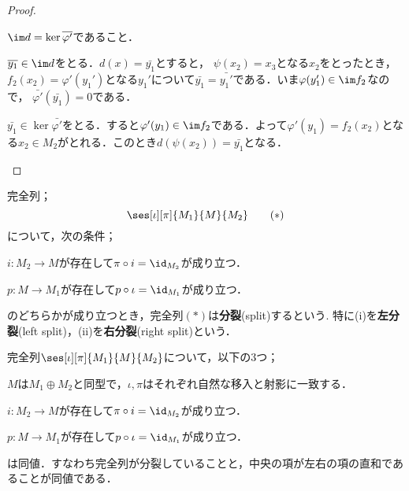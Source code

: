 \begin{proof}
\begin{step}
\begin{sakura}
			\item $\im d=\ker\bar{\varphi'}$であること．
			
			$\bar{y_1}\in\im d$をとる．$d(x)=\bar{y_1}$とすると， $\psi(x_2)=x_3$となる$x_2$をとったとき， $f_2(x_2)=\varphi'(y_1')$となる$y_1'$について$\bar{y_1}=\bar{y_1'}$である．いま$\varphi(y_1')\in\im f_2$なので， $\bar{\varphi'}(\bar{y_1})=0$である．
			
			$\bar{y_1}\in\ker\bar{\varphi'}$をとる．すると$\varphi'(y_1)\in\im f_2$である．よって$\varphi'(y_1)=f_2(x_2)$となる$x_2\in M_2$がとれる．このとき$d(\psi(x_2))=\bar{y_1}$となる．
		\end{sakura}
	\end{step}
\end{proof}

\begin{defi}[分裂完全列]
	完全列；
	\[\ses[\iota][\pi]{M_1}{M}{M_2}\tag{$\ast$}\]
	について，次の条件；
	\begin{sakura}
		\item $i:M_2\to M$が存在して$\pi\circ i=\id_{M_2}$が成り立つ．
		\item $p:M\to M_1$が存在して$p\circ\iota=\id_{M_1}$が成り立つ．
	\end{sakura}
	のどちらかが成り立つとき，完全列$(\ast)$は\textbf{分裂}(split)するという. 特に(i)を\textbf{左分裂}(left split)，(ii)を\textbf{右分裂}(right split)という．
\end{defi}

\begin{lem}[分裂補題]
	完全列$\ses[\iota][\pi]{M_1}{M}{M_2}$について，以下の3つ；
	\begin{sakura}
		\item $M$は$M_1\oplus M_2$と同型で，$\iota,\pi$はそれぞれ自然な移入と射影に一致する．
			
		\item $i:M_2\to M$が存在して$\pi\circ i=\id_{M_2}$が成り立つ．
		
		\item $p:M\to M_1$が存在して$p\circ\iota=\id_{M_1}$が成り立つ．
	\end{sakura}
	は同値．すなわち完全列が分裂していることと，中央の項が左右の項の直和であることが同値である．
\end{lem}

